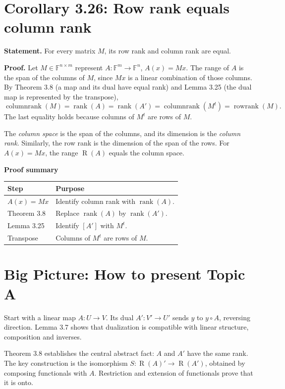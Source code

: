 \documentclass[11pt,a4paper]{article}
\newcommand{\F}{\mathbb F}
\newcommand{\rank}{\operatorname{rank}}
\newcommand{\Ran}{\operatorname{R}}
\newcommand{\prooftable}[1]{\medskip\textbf{Proof summary}\par\smallskip #1\medskip}
\begin{document}
\section{Corollary 3.26: Row rank equals column rank}
\textbf{Statement.} For every matrix \(M\), its row rank and column rank are equal.

\textbf{Proof.} Let \(M\in\F^{n\times m}\) represent \(A:\F^m\to\F^n\), \(A(x)=Mx\). The range of \(A\) is the span of the columns of \(M\), since \(Mx\) is a linear combination of those columns. By Theorem 3.8 (a map and its dual have equal rank) and Lemma 3.25 (the dual map is represented by the transpose),
\[
 \operatorname{columnrank}(M)
 =\rank(A)=\rank(A')
 =\operatorname{columnrank}(M^t)
 =\operatorname{rowrank}(M).
\]
The last equality holds because columns of \(M^t\) are rows of \(M\).

\begin{personalnote}
The \emph{column space} is the span of the columns, and its dimension is the \emph{column rank}. Similarly, the row rank is the dimension of the span of the rows. For \(A(x)=Mx\), the range \(\Ran(A)\) equals the column space.
\end{personalnote}
\prooftable{\begin{tabularx}{\linewidth}{@{}p{.23\linewidth}X@{}}\hline
Step & Purpose\\\hline
\(A(x)=Mx\) & Identify column rank with \(\rank(A)\).\\
Theorem 3.8 & Replace \(\rank(A)\) by \(\rank(A')\).\\
Lemma 3.25 & Identify \([A']\) with \(M^t\).\\
Transpose & Columns of \(M^t\) are rows of \(M\).\\\hline
\end{tabularx}}

\section{Big Picture: How to present Topic A}
Start with a linear map \(A:U\to V\). Its dual \(A':V'\to U'\) sends \(y\) to \(y\circ A\), reversing direction. Lemma 3.7 shows that dualization is compatible with linear structure, composition and inverses.

Theorem 3.8 establishes the central abstract fact: \(A\) and \(A'\) have the same rank. The key construction is the isomorphism \(S:\Ran(A)'\to\Ran(A')\), obtained by composing functionals with \(A\). Restriction and extension of functionals prove that it is onto.
\end{document}
